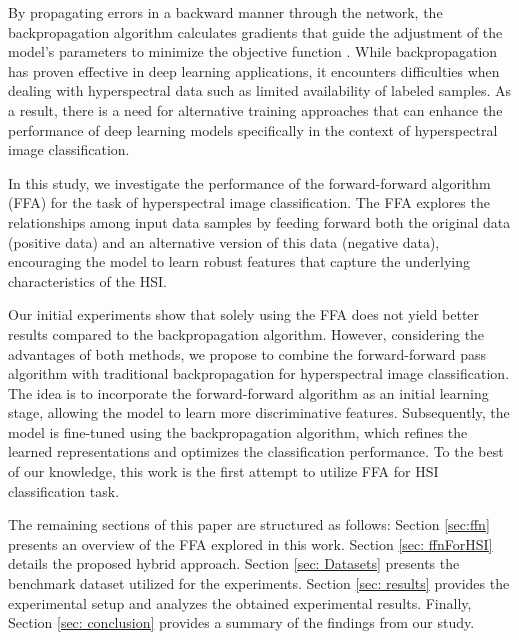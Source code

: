 \documentclass{article}
\begin{document}
By propagating errors in a backward manner through the network, the backpropagation algorithm calculates gradients that guide the adjustment of the model's parameters to minimize the objective function \cite{rumelhart1986learning}. While backpropagation has proven effective in deep learning applications, it encounters difficulties when dealing with hyperspectral data such as limited availability of labeled samples. As a result, there is a need for alternative training approaches that can enhance the performance of deep learning models specifically in the context of hyperspectral image classification.

In this study, we investigate the performance of the forward-forward algorithm (FFA) \cite{hinton2022forward} for the task of hyperspectral image classification. The FFA explores the relationships among input data samples by feeding forward both the original data (positive data) and an alternative version of this data (negative data), encouraging the model to learn robust features that capture the underlying characteristics of the HSI. %

Our initial experiments show that solely using the FFA does not yield better results compared to the backpropagation algorithm. However, considering the advantages of both methods, we propose to combine the forward-forward pass algorithm with traditional backpropagation for hyperspectral image classification. The idea is to incorporate the forward-forward algorithm as an initial learning stage, allowing the model to learn more discriminative features. Subsequently, the model is fine-tuned using the backpropagation algorithm, which refines the learned representations and optimizes the classification performance. To the best of our knowledge, this work is the first attempt to utilize FFA for HSI classification task.


The remaining sections of this paper are structured as follows: Section \ref{sec:ffn} presents an overview of the FFA explored in this work. Section \ref{sec: ffnForHSI} details the proposed hybrid approach. Section \ref{sec: Datasets} presents the benchmark dataset utilized for the experiments. Section \ref{sec: results} provides the experimental setup and analyzes the obtained experimental results. Finally, Section \ref{sec: conclusion} provides a summary of the findings from our study.
\end{document}
